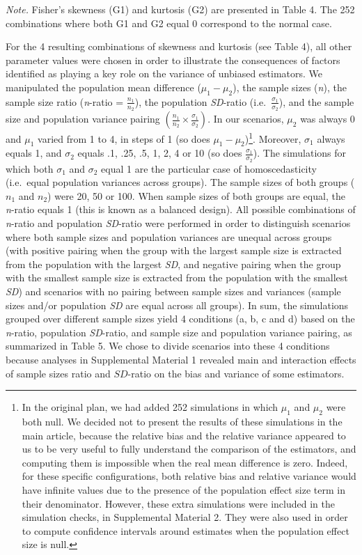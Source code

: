 \documentclass[
  english,
  man,floatsintext]{apa6}
\begin{document}
\emph{Note.} Fisher's skewness (G1) and kurtosis (G2) are presented in Table 4. The 252 combinations where both G1 and G2 equal 0 correspond to the normal case.

For the 4 resulting combinations of skewness and kurtosis (see Table 4), all other parameter values were chosen in order to illustrate the consequences of factors identified as playing a key role on the variance of unbiased estimators. We manipulated the population mean difference (\(\mu_1-\mu_2\)), the sample sizes (\emph{n}), the sample size ratio (\emph{n}-ratio = \(\frac{n_1}{n_2}\)), the population \emph{SD}-ratio (i.e.~\(\frac{\sigma_1}{\sigma_2}\)), and the sample size and population variance pairing \(\left(\frac{n_1}{n_2}\times\frac{\sigma_1}{\sigma_2} \right)\). In our scenarios, \(\mu_2\) was always 0 and \(\mu_1\) varied from 1 to 4, in steps of 1 (so does \(\mu_1-\mu_2\))\footnote{In the original plan, we had added 252 simulations in which $\mu_1$ and $\mu_2$ were both null. We decided not to present the results of these simulations in the main article, because the relative bias and the relative variance appeared to us to be very useful to fully understand the comparison of the estimators, and computing them is impossible when the real mean difference is zero. Indeed, for these specific configurations, both relative bias and relative variance would have infinite values due to the presence of the population effect size term in their denominator. However, these extra simulations were included in the simulation checks, in Supplemental Material 2. They were also used in order to compute confidence intervals around estimates when the population effect size is null.}. Moreover, \(\sigma_1\) always equals 1, and \(\sigma_2\) equals .1, .25, .5, 1, 2, 4 or 10 (so does \(\frac{\sigma_1}{\sigma_2}\)). The simulations for which both \(\sigma_1\) and \(\sigma_2\) equal 1 are the particular case of homoscedasticity (i.e.~equal population variances across groups). The sample sizes of both groups (\(n_1\) and \(n_2\)) were 20, 50 or 100. When sample sizes of both groups are equal, the \emph{n}-ratio equals 1 (this is known as a balanced design). All possible combinations of \emph{n}-ratio and population \emph{SD}-ratio were performed in order to distinguish scenarios where both sample sizes and population variances are unequal across groups (with positive pairing when the group with the largest sample size is extracted from the population with the largest \emph{SD}, and negative pairing when the group with the smallest sample size is extracted from the population with the smallest \emph{SD}) and scenarios with no pairing between sample sizes and variances (sample sizes and/or population \emph{SD} are equal across all groups). In sum, the simulations grouped over different sample sizes yield 4 conditions (a, b, c and d) based on the \emph{n}-ratio, population \emph{SD}-ratio, and sample size and population variance pairing, as summarized in Table 5. We chose to divide scenarios into these 4 conditions because analyses in Supplemental Material 1 revealed main and interaction effects of sample sizes ratio and \(SD\)-ratio on the bias and variance of some estimators.
\end{document}
